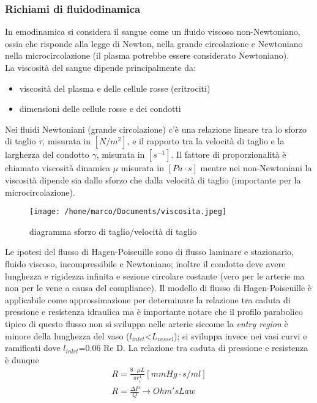 \documentclass[10pt]{article}
\begin{document}
\subsubsection{Richiami di fluidodinamica}
In emodinamica si considera il sangue come un fluido viscoso non-Newtoniano, ossia che risponde alla legge di Newton, nella grande circolazione e Newtoniano nella microcircolazione (il plasma potrebbe essere considerato Newtoniano). \\
La viscosità del sangue dipende principalmente da:
\begin{itemize}
    \item viscosità del plasma e delle cellule rosse (eritrociti)
    \item dimensioni delle cellule rosse e dei condotti
\end{itemize}


Nei fluidi Newtoniani (grande circolazione) c'è una relazione lineare tra lo sforzo di taglio $\tau$, misurata in $[N/m^2]$, e il rapporto tra la velocità di taglio e la larghezza del condotto $\gamma$, misurata in  $[s^{-1}]$. Il fattore di proporzionalità è chiamato viscosità dinamica $\mu$ misurata in $[Pa \cdot s]$ mentre nei non-Newtoniani la viscosità dipende sia dallo sforzo che dalla velocità di taglio (importante per la microcircolazione).

\begin{figure}[h!]
\centering
\texttt{[image: /home/marco/Documents/viscosita.jpeg]}
\caption{diagramma sforzo di taglio/velocità di taglio}
\label{fig:viscosita}
\end{figure}


Le ipotesi del flusso di Hagen-Poiseuille sono di flusso laminare e stazionario, fluido viscoso, incompressibile e Newtoniano; inoltre il condotto deve avere lunghezza e rigidezza infinita e sezione circolare costante (vero per le arterie ma non per le vene a causa del compliance).
Il modello di flusso di Hagen-Poiseuille è applicabile come approssimazione per determinare la relazione tra caduta di pressione e resistenza idraulica ma è importante notare che il profilo parabolico tipico di questo flusso non si sviluppa nelle arterie siccome la \textit{entry region} è minore della lunghezza del vaso ($l_{inlet}$<$L_{vessel}$); si sviluppa invece nei vasi curvi e ramificati dove $l_{inlet}$=0.06 Re D.
 La relazione tra caduta di pressione e resistenza è dunque
 \begin{equation}
     \begin{split}
         R=\frac{8 \cdot \mu L}{\pi r_i^4} [mmHg \cdot s/ml]\\
         R=\frac{\Delta P}{Q} \rightarrow Ohm's Law
     \end{split}
 \end{equation}
 
\end{document}
